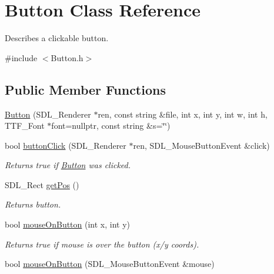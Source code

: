 \hypertarget{class_button}{}\section{Button Class Reference}
\label{class_button}


Describes a clickable button.  




{\ttfamily \#include $<$Button.\+h$>$}

\subsection*{Public Member Functions}
\begin{DoxyCompactItemize}
\item 
\hyperlink{class_button_a605828617975a0a3a330dbebbfa736bf}{Button} (S\+D\+L\+\_\+\+Renderer $\ast$ren, const string \&file, int x, int y, int w, int h, T\+T\+F\+\_\+\+Font $\ast$font=nullptr, const string \&s=\char`\"{}\char`\"{})
\item 
bool \hyperlink{class_button_a1f93070fbcb76faac1b26df1cf04a9e4}{button\+Click} (S\+D\+L\+\_\+\+Renderer $\ast$ren, S\+D\+L\+\_\+\+Mouse\+Button\+Event \&click)\hypertarget{class_button_a1f93070fbcb76faac1b26df1cf04a9e4}{}\label{class_button_a1f93070fbcb76faac1b26df1cf04a9e4}

\begin{DoxyCompactList}\small\item\em Returns true if \hyperlink{class_button}{Button} was clicked. \end{DoxyCompactList}\item 
S\+D\+L\+\_\+\+Rect \hyperlink{class_button_a4aa8e2b4fdc41c911ce7ebbe04ba27f8}{get\+Pos} ()\hypertarget{class_button_a4aa8e2b4fdc41c911ce7ebbe04ba27f8}{}\label{class_button_a4aa8e2b4fdc41c911ce7ebbe04ba27f8}

\begin{DoxyCompactList}\small\item\em Returns button. \end{DoxyCompactList}\item 
bool \hyperlink{class_button_aecc3cba90d8121c6f673b600c13e4bc9}{mouse\+On\+Button} (int x, int y)\hypertarget{class_button_aecc3cba90d8121c6f673b600c13e4bc9}{}\label{class_button_aecc3cba90d8121c6f673b600c13e4bc9}

\begin{DoxyCompactList}\small\item\em Returns true if mouse is over the button (x/y coords). \end{DoxyCompactList}\item 
bool \hyperlink{class_button_a92f3a17475a7a06b82779b1092a1952f}{mouse\+On\+Button} (S\+D\+L\+\_\+\+Mouse\+Button\+Event \&mouse)\hypertarget{class_button_a92f3a17475a7a06b82779b1092a1952f}{}\label{class_button_a92f3a17475a7a06b82779b1092a1952f}


\end{DoxyCompactItemize}
